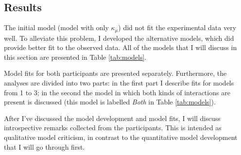 \documentclass{article}\usepackage{knitr}
\begin{document}

\subsection{Results} 

The initial model (model with only $\kappa_{\mu}$) did not fit the experimental data very well. To alleviate this problem, I developed the alternative models, which did provide better fit to the observed data. All of the models that I will discuss in this section are presented in Table \ref{tab:models}. 

Model fits for both participants are presented separately. Furthermore, the analyses are divided into two parts: in the first part I describe fits for models from 1 to 3; in the second the model in which both kinds of interactions are present is discussed (this model is labelled \textit{Both} in Table \ref{tab:models}). 

After I've discussed the model development and model fits, I will discuss introspective remarks collected from the participants. This is intended as qualitative model criticism, in contrast to the quantitative model development that I will go through first. 
\end{document}
